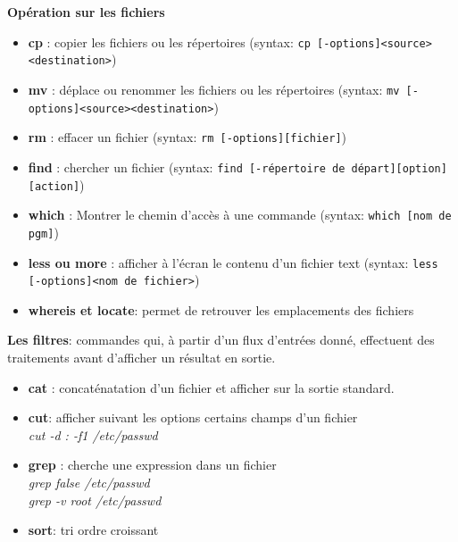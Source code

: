 \documentclass[french]{beamer}
\begin{document}
\begin{frame}
\textbf{Opération sur les fichiers}
    \begin{itemize}
    \item \textbf{cp} : copier les fichiers ou les répertoires (syntax: \texttt{cp [-options]<source><destination>})
    \item \textbf{mv} : déplace ou renommer les fichiers ou les répertoires (syntax: \texttt{mv [-options]<source><destination>})
    \item \textbf{rm} : effacer un fichier (syntax: \texttt{rm [-options][fichier]})
    \item \textbf{find} : chercher un fichier (syntax: \texttt{find [-répertoire de départ][option][action]})
    \item \textbf{which} : Montrer le chemin d'accès à une commande (syntax: \texttt{which [nom de pgm]})
    \item \textbf{less ou more} : afficher à l'écran le contenu d'un fichier text (syntax: \texttt{less [-options]<nom de fichier>})
    \item \textbf{whereis et locate}: permet de retrouver les emplacements des fichiers
    \end{itemize}
\end{frame}

\begin{frame}
\textbf{Les filtres}: commandes qui, à partir d'un flux d'entrées donné,
effectuent des traitements avant d'afficher un résultat en sortie.
    \begin{itemize}
    \item \textbf{cat} : concaténatation d'un fichier et afficher sur la sortie
    standard. \\
    \item \textbf{cut}: afficher suivant les options certains champs d'un
    fichier \\
    \textit{cut -d : -f1 /etc/passwd}
    \item \textbf{grep} : cherche une expression dans un fichier \\
    \textit{grep false /etc/passwd} \\
    \textit{grep -v root /etc/passwd} \\
    \item \textbf{sort}: tri ordre croissant
    \end{itemize}
\end{frame}
\end{document}

